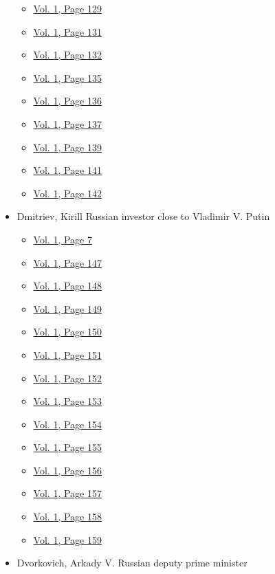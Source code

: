 \begin{itemize}
  \begin{itemize}
  \tightlist
  \item
    \protect\hyperlink{g-page-137}{Vol. 1, Page 129}
  \item
    \protect\hyperlink{g-page-139}{Vol. 1, Page 131}
  \item
    \protect\hyperlink{g-page-140}{Vol. 1, Page 132}
  \item
    \protect\hyperlink{g-page-143}{Vol. 1, Page 135}
  \item
    \protect\hyperlink{g-page-144}{Vol. 1, Page 136}
  \item
    \protect\hyperlink{g-page-145}{Vol. 1, Page 137}
  \item
    \protect\hyperlink{g-page-147}{Vol. 1, Page 139}
  \item
    \protect\hyperlink{g-page-149}{Vol. 1, Page 141}
  \item
    \protect\hyperlink{g-page-150}{Vol. 1, Page 142}
  \end{itemize}
\item
  Dmitriev, Kirill Russian investor close to Vladimir V. Putin

  \begin{itemize}
  \tightlist
  \item
    \protect\hyperlink{g-page-15}{Vol. 1, Page 7}
  \item
    \protect\hyperlink{g-page-155}{Vol. 1, Page 147}
  \item
    \protect\hyperlink{g-page-156}{Vol. 1, Page 148}
  \item
    \protect\hyperlink{g-page-157}{Vol. 1, Page 149}
  \item
    \protect\hyperlink{g-page-158}{Vol. 1, Page 150}
  \item
    \protect\hyperlink{g-page-159}{Vol. 1, Page 151}
  \item
    \protect\hyperlink{g-page-160}{Vol. 1, Page 152}
  \item
    \protect\hyperlink{g-page-161}{Vol. 1, Page 153}
  \item
    \protect\hyperlink{g-page-162}{Vol. 1, Page 154}
  \item
    \protect\hyperlink{g-page-163}{Vol. 1, Page 155}
  \item
    \protect\hyperlink{g-page-164}{Vol. 1, Page 156}
  \item
    \protect\hyperlink{g-page-165}{Vol. 1, Page 157}
  \item
    \protect\hyperlink{g-page-166}{Vol. 1, Page 158}
  \item
    \protect\hyperlink{g-page-167}{Vol. 1, Page 159}
  \end{itemize}
\item
  Dvorkovich, Arkady V. Russian deputy prime minister


\end{itemize}
